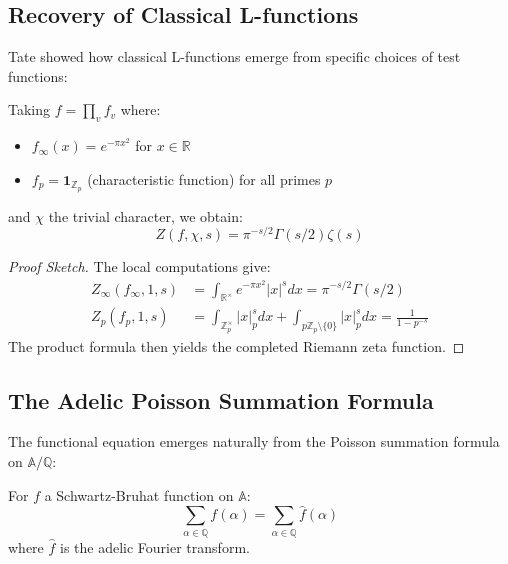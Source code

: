 \subsection{Recovery of Classical L-functions}

Tate showed how classical L-functions emerge from specific choices of test functions:

\begin{theorem}
Taking $f = \prod_v f_v$ where:
\begin{itemize}
\item $f_\infty(x) = e^{-\pi x^2}$ for $x \in \mathbb{R}$
\item $f_p = \mathbf{1}_{\mathbb{Z}_p}$ (characteristic function) for all primes $p$
\end{itemize}
and $\chi$ the trivial character, we obtain:
\begin{equation}
Z(f, \chi, s) = \pi^{-s/2} \Gamma(s/2) \zeta(s)
\end{equation}
\end{theorem}

\begin{proof}[Proof Sketch]
The local computations give:
\begin{align}
Z_\infty(f_\infty, 1, s) &= \int_{\mathbb{R}^{\times}} e^{-\pi x^2} |x|^s dx = \pi^{-s/2} \Gamma(s/2) \\
Z_p(f_p, 1, s) &= \int_{\mathbb{Z}_p^{\times}} |x|_p^s dx + \int_{p\mathbb{Z}_p \setminus \{0\}} |x|_p^s dx = \frac{1}{1 - p^{-s}}
\end{align}
The product formula then yields the completed Riemann zeta function.
\end{proof}

\subsection{The Adelic Poisson Summation Formula}

The functional equation emerges naturally from the Poisson summation formula on $\mathbb{A}/\mathbb{Q}$:

\begin{theorem}
For $f$ a Schwartz-Bruhat function on $\mathbb{A}$:
\begin{equation}
\sum_{\alpha \in \mathbb{Q}} f(\alpha) = \sum_{\alpha \in \mathbb{Q}} \hat{f}(\alpha)
\end{equation}
where $\hat{f}$ is the adelic Fourier transform.
\end{theorem}

